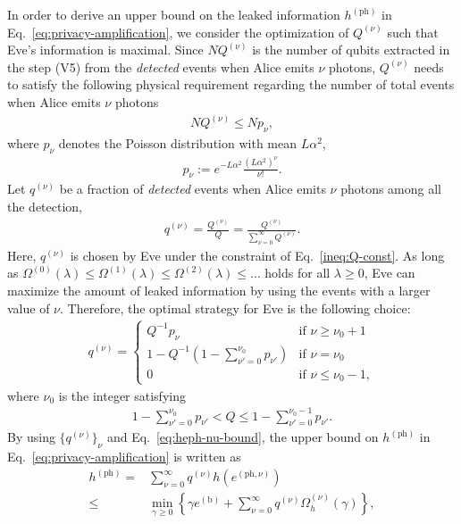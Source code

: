 \documentclass[twocolumn,superscriptaddress,pra,footinbib,notitlepage]{revtex4-1}
\newcommand{\1}{\mbox{1}\hspace{-0.25em}\mbox{l}}
\begin{document}
In order to derive an upper bound on the leaked information $h^{(\textrm{ph})}$ in Eq.~\eqref{eq:privacy-amplification}, we consider the optimization of $Q^{(\nu)}$ such that Eve's information is maximal. Since $NQ^{(\nu)}$ is the number of qubits extracted in the step (V5) from the \textit{detected} events when Alice emits $\nu$ photons, $Q^{(\nu)}$ needs to satisfy the following physical requirement regarding the number of total events when Alice emits $\nu$ photons
\begin{align}
NQ^{(\nu)}\leq Np_\nu,\label{ineq:Q-const}
\end{align}
where $p_\nu$ denotes the Poisson distribution with mean $L\alpha^2$,
\begin{align}
p_\nu:=e^{-L\alpha^2}\frac{(L\alpha^2)^\nu}{\nu!}.
\end{align}
Let $q^{(\nu)}$ be a fraction of \textit{detected} events when Alice emits $\nu$ photons 
among all the detection,
\begin{align}
q^{(\nu)}=\frac{Q^{(\nu)}}{Q}=\frac{Q^{(\nu)}}{\sum_{\nu=0}^\infty Q^{(\nu)}}.
\end{align}
Here, $q^{(\nu)}$ is chosen by Eve under the constraint of Eq.~\eqref{ineq:Q-const}.
As long as $\Omega^{(0)}(\lambda)\leq\Omega^{(1)}(\lambda)\leq\Omega^{(2)}(\lambda)\leq\dots$ holds for all $\lambda\geq0$, Eve can maximize the amount of leaked information by using the events with a larger value of $\nu$.
Therefore, the optimal strategy for Eve is the following choice:
\begin{align}
q^{(\nu)}=
\begin{cases}
Q^{-1}p_\nu&\textrm{if }\nu\geq \nu_0+1\\
1-Q^{-1}(1-\sum_{\nu'=0}^{\nu_0}p_{\nu'})&\textrm{if }\nu=\nu_0\\
0&\textrm{if }\nu\leq\nu_0-1,
\end{cases}
\end{align}
where $\nu_0$ is the integer satisfying
\begin{align}
1-\sum_{\nu'=0}^{\nu_0}p_{\nu'}<Q\leq1-\sum_{\nu'=0}^{\nu_0-1}p_{\nu'}.
\end{align}
By using $\{q^{(\nu)}\}_\nu$ and Eq.~\eqref{eq:heph-nu-bound}, the upper bound on $h^{(\textrm{ph})}$ in Eq.~\eqref{eq:privacy-amplification} is written as
\begin{align}
h^{(\textrm{ph})}=&\sum_{\nu=0}^\infty q^{(\nu)}h(e^{(\textrm{ph}, \nu)})\nonumber\\
\leq&\min_{\gamma\geq0}\left\{\gamma e^{(\textrm{b})}+\sum_{\nu=0}^\infty q^{(\nu)}\Omega_h^{(\nu)}(\gamma)\right\},\label{eq:heph-bound-tight}
\end{align}
\end{document}
